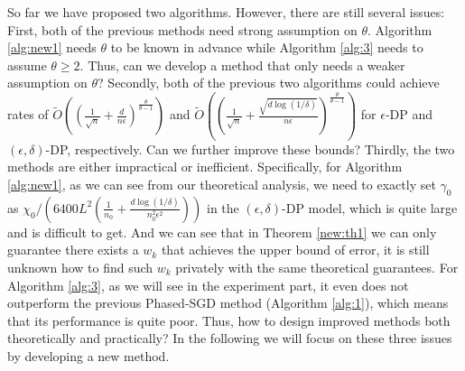 \documentclass[12pt]{alt2022} %
\renewcommand{\tilde}{\widetilde}
\begin{document}
So far we have proposed two algorithms. However, there are still several issues: First, both of the previous methods need strong assumption on $\theta$. Algorithm \ref{alg:new1} needs $\theta$ to be known in advance while Algorithm \ref{alg:3} needs to assume $\theta\geq 2$. Thus, can we develop a method that only needs a weaker assumption on $\theta$? Secondly, both of the previous two algorithms could achieve rates of 	$\tilde{O}((\frac{1}{\sqrt{n}}+\frac{d}{n\epsilon})^\frac{\theta}{\theta-1}) $ and $\tilde{O}((\frac{1}{\sqrt{n}}+\frac{\sqrt{d\log(1/\delta)}}{n\epsilon})^\frac{\theta}{\theta-1})$ for $\epsilon$-DP and $(\epsilon, \delta)$-DP, respectively. Can we further improve these bounds? Thirdly, the two methods are either impractical or inefficient. Specifically, for Algorithm \ref{alg:new1}, as we can see from our theoretical analysis, we need to exactly set $\gamma_0$ as $\chi_0 / ({6400 L^2}(\frac{1}{n_0}+\frac{d\log(1/\delta)}{n_0^2\epsilon^2}))$ in the $(\epsilon, \delta)$-DP model, which is quite large and is difficult to get. And we can see that in Theorem \ref{new:th1} we can only guarantee there exists a $w_k$ that achieves the upper bound of error, it is still unknown how to find such $w_k$ privately with the same theoretical guarantees. For Algorithm \ref{alg:3}, as we will see in the experiment part, it even does not outperform the previous Phased-SGD method (Algorithm \ref{alg:1}), which means that its performance is quite poor. Thus, how to design improved methods both theoretically and practically? In the following we will focus on these three issues by developing a new method. 
\end{document}
